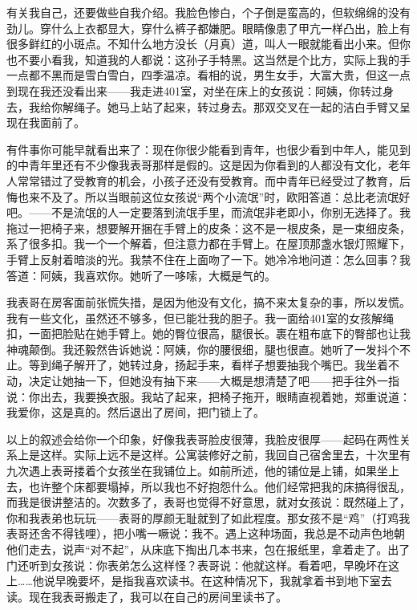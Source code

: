 有关我自己，还要做些自我介绍。我脸色惨白，个子倒是蛮高的，但软绵绵的没有劲儿。穿什么上衣都显大，穿什么裤子都嫌肥。眼睛像患了甲亢一样凸出，脸上有很多鲜红的小斑点。不知什么地方没长（月真）道，叫人一眼就能看出小来。但你也不要小看我，知道我的人都说：这孙子手特黑。这当然是个比方，实际上我的手一点都不黑而是雪白雪白，四季温凉。看相的说，男生女手，大富大贵，但这一点到现在我还没看出来——我走进401室，对坐在床上的女孩说：阿姨，你转过身去，我给你解绳子。她马上站了起来，转过身去。那双交叉在一起的洁白手臂又呈现在我面前了。 

有件事你可能早就看出来了：现在你很少能看到青年，也很少看到中年人，能见到的中青年里还有不少像我表哥那样是假的。这是因为你看到的人都没有文化，老年人常常错过了受教育的机会，小孩子还没有受教育。而中青年已经受过了教育，后悔也来不及了。所以当眼前这位女孩说“两个小流氓”时，欧阳答道：总比老流氓好吧。——不是流氓的人一定要落到流氓手里，而流氓非老即小，你别无选择了。我拖过一把椅子来，想要解开捆在手臂上的皮条：这不是一根皮条，是一束细皮条，系了很多扣。我一个一个解着，但注意力都在手臂上。在屋顶那盏水银灯照耀下，手臂上反射着暗淡的光。我禁不住在上面吻了一下。她冷冷地问道：怎么回事？我答道：阿姨，我喜欢你。她听了一哆嗦，大概是气的。 

我表哥在房客面前张慌失措，是因为他没有文化，搞不来太复杂的事，所以发慌。我有一些文化，虽然还不够多，但已能壮我的胆子。我一面给401室的女孩解绳扣，一面把脸贴在她手臂上。她的臀位很高，腿很长。裹在粗布底下的臀部也让我神魂颠倒。我还毅然告诉她说：阿姨，你的腰很细，腿也很直。她听了一发抖个不止。等到绳子解开了，她转过身，扬起手来，看样子想要抽我个嘴巴。我坐着不动，决定让她抽一下，但她没有抽下来——大概是想清楚了吧——把手往外一指说：你出去，我要换衣服。我站了起来，把椅子拖开，眼睛直视着她，郑重说道：我爱你，这是真的。然后退出了房间，把门锁上了。 



以上的叙述会给你一个印象，好像我表哥脸皮很薄，我脸皮很厚——起码在两性关系上是这样。实际上远不是这样。公寓装修好之前，我回自己宿舍里去，十次里有九次遇上表哥搂着个女孩坐在我铺位上。如前所述，他的铺位是上铺，如果坐上去，也许整个床都要塌掉，所以我也不好抱怨什么。他们经常把我的床搞得很乱，而我是很讲整洁的。次数多了，表哥也觉得不好意思，就对女孩说：既然碰上了，你和我表弟也玩玩——表哥的厚颜无耻就到了如此程度。那女孩不是“鸡”（打鸡我表哥还舍不得钱哩），把小嘴一噘说：我不。遇上这种场面，我总是不动声色地朝他们走去，说声“对不起”，从床底下掏出几本书来，包在报纸里，拿着走了。出了门还听到女孩说：你表弟怎么这样怪？表哥说：他就这样。看着吧，早晚坏在这上……他说早晚要坏，是指我喜欢读书。在这种情况下，我就拿着书到地下室去读。现在我表哥搬走了，我可以在自己的房间里读书了。 

